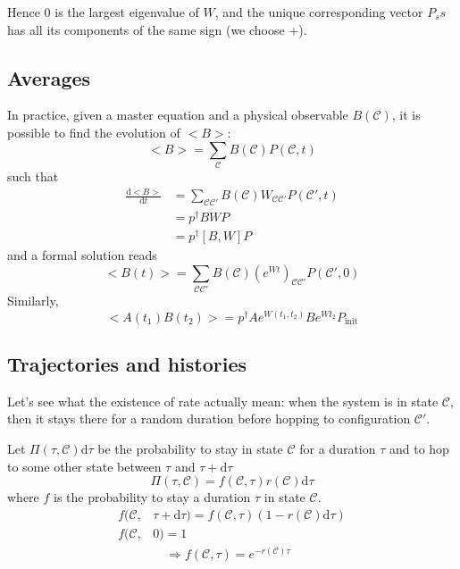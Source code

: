 \documentclass[a4paper]{book}
\theoremstyle{definition}
\theoremstyle{remark}
\begin{document}
Hence 0 is the largest eigenvalue of $W$, and the unique corresponding vector $P_ss$ has all its components of the same sign (we choose +).

\subsection{Averages}
In practice, given a master equation and a physical observable $B(\mathscr{C})$, it is possible to find the evolution of $<B>$:
\begin{equation}
    <B> = \sum_{\mathscr{C}} B(\mathscr{C})P(\mathscr{C}, t)
\end{equation}
such that 
\begin{equation}
    \begin{aligned}
        \frac{\text{d}<B>}{\text{d}t} &= \sum_{\mathscr{C}\mathscr{C}'} B(\mathscr{C})W_{\mathscr{C}\mathscr{C}'}P(\mathscr{C}', t) \\
        &= p^\dagger BWP \\ 
        &= p^\dagger [B, W]P
    \end{aligned}
\end{equation}
and a formal solution reads 
\begin{equation}
    <B(t)> = \sum_{\mathscr{C}\mathscr{C}'}B(\mathscr{C})(e^{Wt})_{\mathscr{C}\mathscr{C}'} P(\mathscr{C}', 0)
\end{equation}
Similarly, 
\begin{equation}
    <A(t_1)B(t_2)> = p^\dagger Ae^{W(t_1, t_2)}Be^{Wt_2}P_{\text{init}}
\end{equation}

\subsection{Trajectories and histories}

Let's see what the existence of rate actually mean: when the system is in state $\mathscr{C}$, then it stays there for a random duration before hopping to configuration $\mathscr{C}'$. \par \medskip 

Let $\Pi(\tau, \mathscr{C})\text{d}\tau$ be the probability to stay in state $\mathscr{C}$ for a duration $\tau$ and to hop to some other state between $\tau$ and $\tau + \text{d}\tau$
\begin{equation}
    \Pi(\tau, \mathscr{C}) = f(\mathscr{C}, \tau)r(\mathscr{C})\text{d}\tau
\end{equation}
where $f$ is the probability to stay a duration $\tau$ in state $\mathscr{C}$. 
\begin{equation}
    \begin{aligned}
        f(\mathscr{C},& \tau + \text{d}\tau) = f(\mathscr{C}, \tau)(1-r(\mathscr{C})\text{d}\tau) \\ 
        f(\mathscr{C},& 0) = 1 \\
        &\quad \Rightarrow f(\mathscr{C}, \tau) = e^{-r(\mathscr{C})\tau}
    \end{aligned}
\end{equation}
\end{document}

